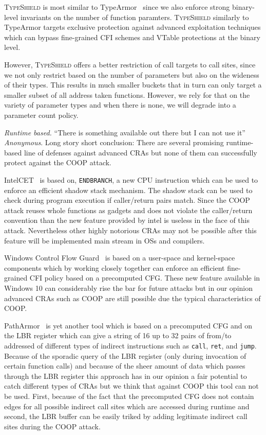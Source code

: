 \textsc{TypeShield} is most similar to TypeArmor~\cite{veen:typearmor} since
we also enforce strong binary-level invariants on the number of function
paramters. \textsc{TypeShield} similarly to TypeArmor targets 
exclusive protection against advanced exploitation techniques 
which can bypass fine-grained CFI schemes and VTable protections at the binary level.

However, \textsc{TypeShield} offers a better restriction of call targets to call sites, since 
we not only restrict based on the number of parameters but also on the wideness of their types. 
This results in much smaller buckets that in turn can only target a smaller subset of all address
taken functions. However, we rely for that on the variety of parameter types and when there is 
none, we will degrade into a parameter count policy.

\textit{Runtime based.}
``There is something available out there but I can not use it'' \textit{Anonymous}.
Long story short conclusion: There are several promising runtime-based line of defenses against
advanced CRAs but none of them can successfully protect against the COOP attack.

IntelCET~\cite{intel:cet} is based on, \texttt{ENDBRANCH}, a new CPU instruction which can be used to enforce
an efficient shadow stack mechanism. The shadow stack can be used to check during program execution if caller/return pairs match.
Since the COOP attack reuses whole functions as gadgets and does not violate the caller/return convention than the 
new feature provided by intel is useless in the face of this attack. Nevertheless other highly notorious CRAs may not be possible
after this feature will be implemented main stream in OSs and compilers.

Windows Control Flow Guard~\cite{windows:cfguard} is based on a user-space and kernel-space components which
by working closely together can enforce an efficient fine-grained CFI policy based on a precomputed CFG.
These new feature available in Windows 10 can considerably rise the bar for future attacks but in our opinion advanced CRAs
such as COOP are still possible due the typical characteristics of COOP.

PathArmor~\cite{veen:cfi} is yet another tool which is based on a precomputed CFG and on the LBR register which can give a string of 16 up to
32 pairs of from/to addressed of different types of indirect instructions such as \texttt{call}, \texttt{ret}, and \texttt{jump}. 
Because of the sporadic query of the LBR register (only during invocation of certain function calls) and because of the sheer amount of 
data which passes through the LBR register this approach has in our opinion a fair potential to catch different types of CRAs but
we think that against COOP this tool can not be used. First, because of the fact that the precomputed CFG does not contain edges for all
possible indirect call sites which are accessed during runtime and second, the LBR buffer can be easily triked by adding
legitimate indirect call sites  during the COOP attack.

